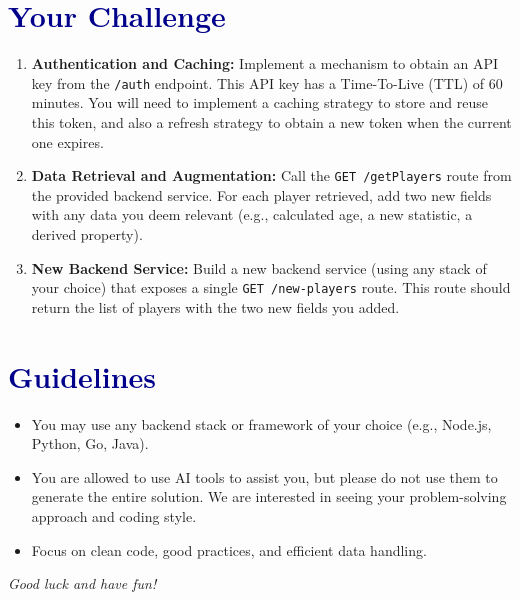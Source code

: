 \documentclass[10pt, a4paper]{article}
\begin{document}
\section*{\textcolor{darkblue}{Your Challenge}}
\begin{enumerate}[label=\arabic*., leftmargin=*, itemsep=0.5em]
    \item \textbf{Authentication and Caching:} Implement a mechanism to obtain an API key from the \texttt{/auth} endpoint. This API key has a Time-To-Live (TTL) of 60 minutes. You will need to implement a caching strategy to store and reuse this token, and also a refresh strategy to obtain a new token when the current one expires.
    \item \textbf{Data Retrieval and Augmentation:} Call the \texttt{GET /getPlayers} route from the provided backend service. For each player retrieved, add two new fields with any data you deem relevant (e.g., calculated age, a new statistic, a derived property).
    \item \textbf{New Backend Service:} Build a new backend service (using any stack of your choice) that exposes a single \texttt{GET /new-players} route. This route should return the list of players with the two new fields you added.
\end{enumerate}

\section*{\textcolor{darkblue}{Guidelines}}
\begin{itemize}[label=\textbullet, leftmargin=*, itemsep=0.5em]
    \item You may use any backend stack or framework of your choice (e.g., Node.js, Python, Go, Java).
    \item You are allowed to use AI tools to assist you, but please do not use them to generate the entire solution. We are interested in seeing your problem-solving approach and coding style.
    \item Focus on clean code, good practices, and efficient data handling.
\end{itemize}

\vspace{1cm}
\begin{center}
    \textit{Good luck and have fun!}
\end{center}
\end{document}
